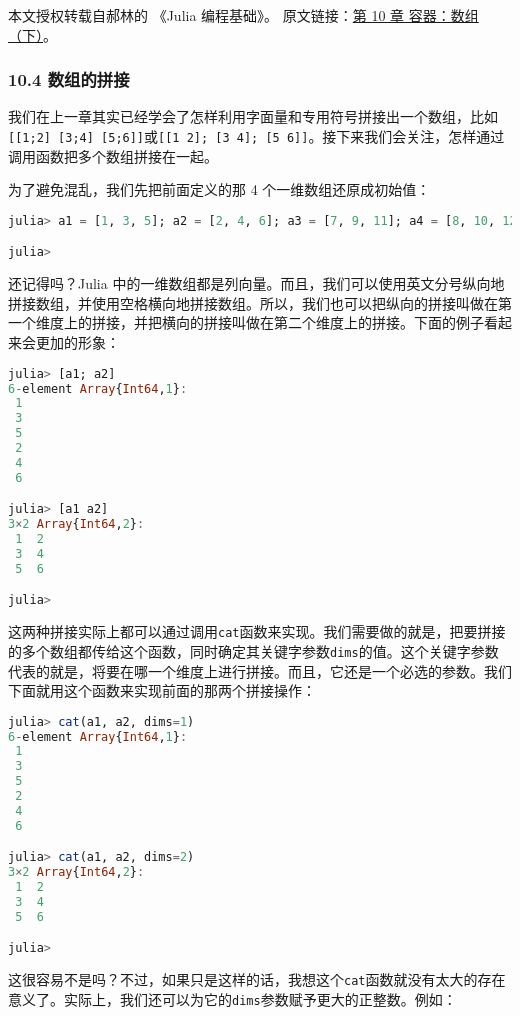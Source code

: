 
本文授权转载自郝林的 《Julia 编程基础》。 原文链接：\href{https://github.com/hyper0x/JuliaBasics/blob/master/book/ch10.md}{第 10 章 容器：数组（下）}。


\subsubsection{10.4 数组的拼接}

我们在上一章其实已经学会了怎样利用字面量和专用符号拼接出一个数组，比如\verb`[[1;2] [3;4] [5;6]]`或\verb`[[1 2]; [3 4]; [5 6]]`。接下来我们会关注，怎样通过调用函数把多个数组拼接在一起。

为了避免混乱，我们先把前面定义的那 4 个一维数组还原成初始值：

\begin{lstlisting}[language=julia]
julia> a1 = [1, 3, 5]; a2 = [2, 4, 6]; a3 = [7, 9, 11]; a4 = [8, 10, 12];

julia>
\end{lstlisting}

还记得吗？Julia 中的一维数组都是列向量。而且，我们可以使用英文分号纵向地拼接数组，并使用空格横向地拼接数组。所以，我们也可以把纵向的拼接叫做在第一个维度上的拼接，并把横向的拼接叫做在第二个维度上的拼接。下面的例子看起来会更加的形象：

\begin{lstlisting}[language=julia]
julia> [a1; a2]
6-element Array{Int64,1}:
 1
 3
 5
 2
 4
 6

julia> [a1 a2]
3×2 Array{Int64,2}:
 1  2
 3  4
 5  6

julia> 
\end{lstlisting}

这两种拼接实际上都可以通过调用\verb`cat`函数来实现。我们需要做的就是，把要拼接的多个数组都传给这个函数，同时确定其关键字参数\verb`dims`的值。这个关键字参数代表的就是，将要在哪一个维度上进行拼接。而且，它还是一个必选的参数。我们下面就用这个函数来实现前面的那两个拼接操作：

\begin{lstlisting}[language=julia]
julia> cat(a1, a2, dims=1)
6-element Array{Int64,1}:
 1
 3
 5
 2
 4
 6

julia> cat(a1, a2, dims=2)
3×2 Array{Int64,2}:
 1  2
 3  4
 5  6

julia> 
\end{lstlisting}

这很容易不是吗？不过，如果只是这样的话，我想这个\verb`cat`函数就没有太大的存在意义了。实际上，我们还可以为它的\verb`dims`参数赋予更大的正整数。例如：

